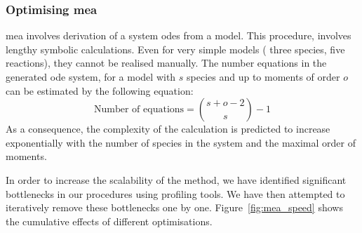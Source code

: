 \subsubsection{Optimising \acrlong{mea}}
\label{sec:optimising_mea}


\gls{mea} involves derivation of a system \gls{ode}s from a model.
This procedure\cite{ale_general_2013}, involves lengthy symbolic calculations.
Even for very simple models (\eg{} three species, five reactions), they cannot be realised manually.
The number equations in the generated \gls{ode} system, for a model with $s$ species and up to moments of order $o$ can be estimated by the following equation: 
\begin{displaymath}
    \text{Number of equations} = {{s + o - 2} \choose {s}} - 1
\end{displaymath}
As a consequence, the complexity of the calculation is predicted to increase exponentially with the number of species in the system and the maximal order of moments. 


In order to increase the scalability of the method, we have identified significant bottlenecks in our procedures using \py{} profiling tools. We have then attempted to iteratively remove these bottlenecks one by one. Figure~\ref{fig:mea_speed} shows the cumulative effects of different optimisations.



